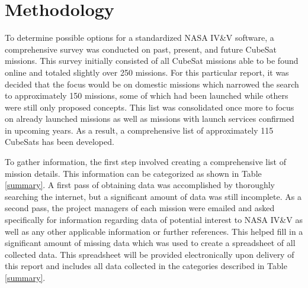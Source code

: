 \documentclass[11pt]{article}
\begin{document}
\section{Methodology}
To determine possible options for a standardized NASA IV\&V software, a comprehensive survey was conducted on past, present, and future CubeSat missions.  This survey initially consisted of all CubeSat missions able to be found online and totaled slightly over 250 missions.  For this particular report, it was decided that the focus would be on domestic missions which narrowed the search to approximately 150 missions, some of which had been launched while others were still only proposed concepts.  This list was consolidated once more to focus on already launched missions as well as missions with launch services confirmed in upcoming years.  
As a result, a comprehensive list of approximately 115 CubeSats has been developed.  

To gather information, the first step involved creating a comprehensive list of mission details.  This information can be categorized as shown in Table \ref{summary}.  A first pass of obtaining data was accomplished by thoroughly searching the internet, but a significant amount of data was still incomplete.  As a second pass, the project managers of each mission were emailed and asked specifically for information regarding data of potential interest to NASA IV\&V as well as any other applicable information or further references.  This helped fill in a significant amount of missing data which was used to create a spreadsheet of all collected data.  This spreadsheet will be provided electronically upon delivery of this report and includes all data collected in the categories described in Table \ref{summary}.
\end{document}
